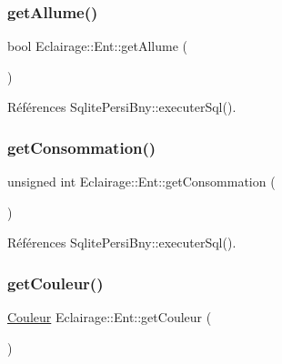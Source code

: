 \subsubsection{\texorpdfstring{get\+Allume()}{getAllume()}}
{\footnotesize\ttfamily bool Eclairage\+::\+Ent\+::get\+Allume (\begin{DoxyParamCaption}{ }\end{DoxyParamCaption})\hspace{0.3cm}{\ttfamily [virtual]}}



Références Sqlite\+Persi\+Bny\+::executer\+Sql().

\mbox{\label{classEclairage_1_1Ent_afb847965b5bcccc415bb169e500656f9}} 
\subsubsection{\texorpdfstring{get\+Consommation()}{getConsommation()}}
{\footnotesize\ttfamily unsigned int Eclairage\+::\+Ent\+::get\+Consommation (\begin{DoxyParamCaption}{ }\end{DoxyParamCaption})\hspace{0.3cm}{\ttfamily [virtual]}}



Références Sqlite\+Persi\+Bny\+::executer\+Sql().

\mbox{\label{classEclairage_1_1Ent_aaedbcf1b433035acb8470b0c4c50f826}} 
\subsubsection{\texorpdfstring{get\+Couleur()}{getCouleur()}}
{\footnotesize\ttfamily \hyperlink{Couleur_8h_aa304d0ca681f782b1d7735da33037dd7}{Couleur} Eclairage\+::\+Ent\+::get\+Couleur (\begin{DoxyParamCaption}{ }\end{DoxyParamCaption})\hspace{0.3cm}{\ttfamily [virtual]}}



